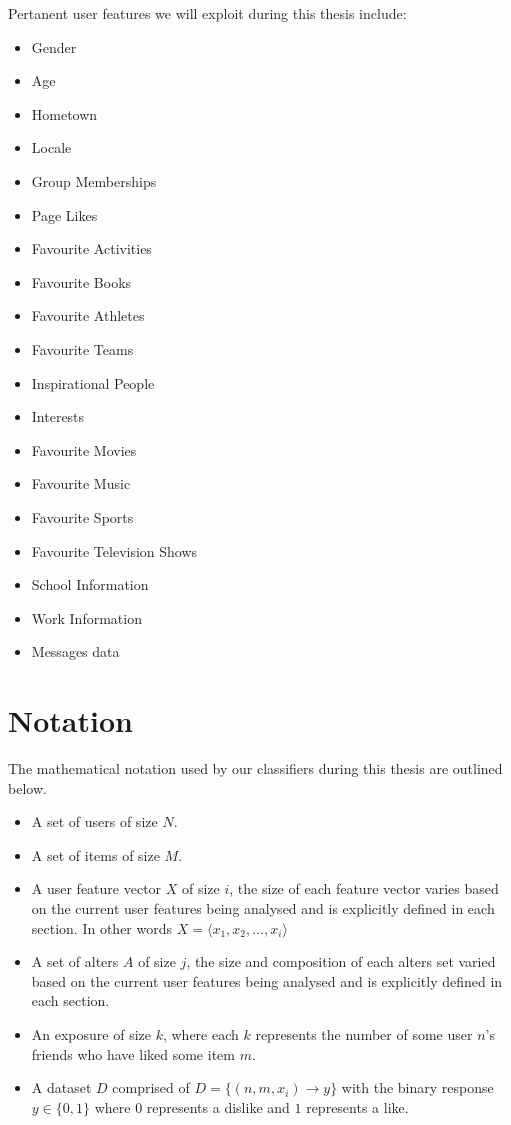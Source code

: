 \clearpage

Pertanent user features we will exploit during this thesis include:
\begin{itemize}
\item Gender
\item Age
\item Hometown
\item Locale
\item Group Memberships
\item Page Likes
\item Favourite Activities
\item Favourite Books
\item Favourite Athletes
\item Favourite Teams
\item Inspirational People
\item Interests
\item Favourite Movies
\item Favourite Music
\item Favourite Sports
\item Favourite Television Shows
\item School Information
\item Work Information
\item Messages data
\end{itemize}

\section{Notation}
\label{sec:notation}

The mathematical notation used by our classifiers during this thesis are outlined below.

\begin{itemize}
\item A set of users of size $N$. 
\item A set of items of size $M$.
\item A user feature vector $X$ of size $i$, the size of each feature vector varies based on the current user features being analysed
and is explicitly defined in each section. In other words $X = \langle x_1, x_2, \dots , x_i \rangle$
\item A set of alters $A$ of size $j$, the size and composition of each alters set varied based on the current user features being 
analysed and is explicitly defined in each section.
\item An exposure of size $k$, where each $k$ represents the number of some user $n$'s friends who have liked some item $m$.
\item A dataset $D$ comprised of $D = \{(n,m,x_i) \to y\}$ with the binary response $y \in \{0,1\}$ where $0$ represents a dislike 
and $1$ represents a like.
\end{itemize}

